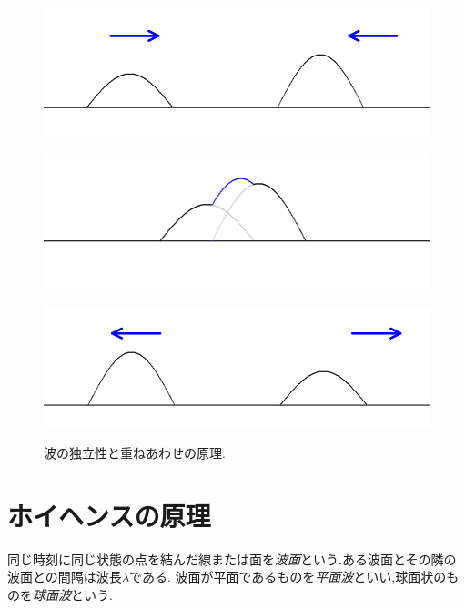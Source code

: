 \begin{figure}[htbp]
\begin{minipage}[b]{1.0\linewidth}
\centering
\includegraphics[keepaspectratio, scale=0.45]
  {../background/synwave1.png}
 \label{synwave1}
 \end{minipage}
 
\begin{minipage}[b]{1.0\linewidth}
\centering
  \includegraphics[keepaspectratio, scale=0.45]
  {../background/synwave2.png}
 \label{synwave2}
 \end{minipage}
  
  \begin{minipage}[b]{1.0\linewidth}
\centering
  \includegraphics[keepaspectratio, scale=0.45]
  {../background/synwave3.png}
 \label{synwave3}
 \end{minipage}
  
  \caption{波の独立性と重ねあわせの原理.}
 \label{fig:synwave}
\end{figure}

\section{ホイヘンスの原理}
同じ時刻に同じ状態の点を結んだ線または面を\emph{波面}という.ある波面とその隣の波面との間隔は波長$\lambda$である.
波面が平面であるものを\emph{平面波}といい,球面状のものを\emph{球面波}という.

